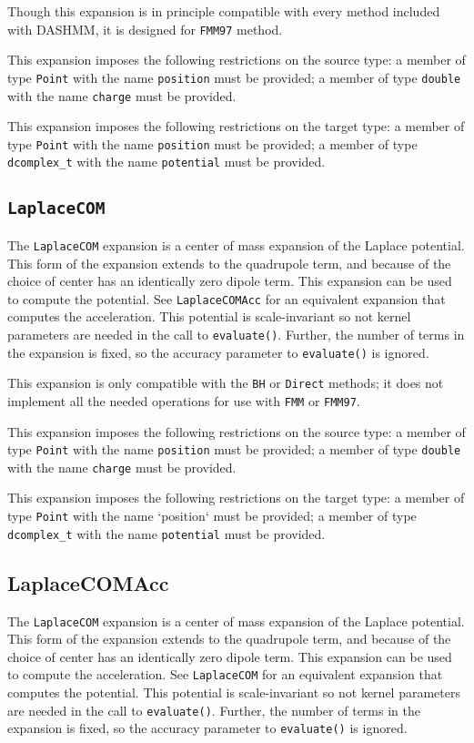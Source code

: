 \documentclass[11pt]{book}
\begin{document}
Though this expansion is in principle compatible with every method included
with DASHMM, it is designed for {\tt FMM97} method.

This expansion imposes the following restrictions on the source type: a
member of type {\tt Point} with the name {\tt position} must be provided; 
a member of
type {\tt double} with the name {\tt charge} must be provided.

This expansion imposes the following restrictions on the target type: a
member of type {\tt Point} with the name {\tt position} must be provided; 
a member of type {\tt dcomplex\_t} with the name {\tt potential}
 must be provided.

\subsection{{\tt LaplaceCOM}}

The {\tt LaplaceCOM} expansion is a center of mass expansion of the Laplace
potential. This form of the expansion extends to the quadrupole term, and
because of the choice of center has an identically zero dipole term. This
expansion can be used to compute the potential. See {\tt LaplaceCOMAcc} for an
equivalent expansion that computes the acceleration. This potential is
scale-invariant so not kernel parameters are needed in the call to 
{\tt evaluate()}. 
Further, the number of terms in the expansion is fixed, so the accuracy
parameter to {\tt evaluate()} is ignored.

This expansion is only compatible with the {\tt BH} or {\tt Direct} methods; 
it does
not implement all the needed operations for use with {\tt FMM} or {\tt FMM97}.

This expansion imposes the following restrictions on the source type: a
member of type {\tt Point} 
with the name {\tt position} must be provided; a member of
type {\tt double} with the name {\tt charge} must be provided.

This expansion imposes the following restrictions on the target type: a
member of type {\tt Point} with the name `position` must be provided; a member
of 
type {\tt dcomplex\_t} with the name {\tt potential} must be provided.

\subsection{LaplaceCOMAcc}

The {\tt LaplaceCOM} expansion is a center of mass expansion of the Laplace
potential. This form of the expansion extends to the quadrupole term, and
because of the choice of center has an identically zero dipole term. This
expansion can be used to compute the acceleration. See {\tt LaplaceCOM} for an
equivalent expansion that computes the potential. This potential is
scale-invariant so not kernel parameters are needed in the call to 
{\tt evaluate()}. Further, the number of terms in the expansion is fixed, so the
accuracy parameter to {\tt evaluate()} is ignored.
\end{document}
